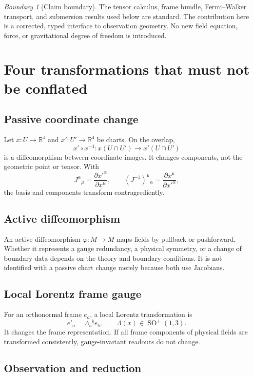 \documentclass[11pt,a4paper]{article}
\theoremstyle{definition}
\theoremstyle{plain}
\theoremstyle{remark}
\newtheorem{warning}[definition]{Boundary}
\newcommand{\R}{\mathbb{R}}
\newcommand{\SO}{\operatorname{SO}}
\begin{document}
\begin{warning}[Claim boundary]
The tensor calculus, frame bundle, Fermi--Walker transport, and submersion
results used below are standard. The contribution here is a corrected,
typed interface to observation geometry. No new field equation, force,
or gravitational degree of freedom is introduced.
\end{warning}

\section{Four transformations that must not be conflated}

\subsection{Passive coordinate change}

Let $x:U\to\R^4$ and $x':U'\to\R^4$ be charts. On the overlap,
\[
x'\circ x^{-1}:x(U\cap U')\to x'(U\cap U')
\]
is a diffeomorphism between coordinate images. It changes components, not
the geometric point or tensor. With
\[
J^\alpha{}_\mu=\frac{\partial x'^\alpha}{\partial x^\mu},
\qquad
(J^{-1})^\mu{}_\alpha
=\frac{\partial x^\mu}{\partial x'^\alpha},
\]
the basis and components transform contragrediently.

\subsection{Active diffeomorphism}

An active diffeomorphism $\varphi:M\to M$ maps fields by pullback or
pushforward. Whether it represents a gauge redundancy, a physical symmetry,
or a change of boundary data depends on the theory and boundary conditions.
It is not identified with a passive chart change merely because both use
Jacobians.

\subsection{Local Lorentz frame gauge}

For an orthonormal frame $e_a$, a local Lorentz transformation is
\[
e'_a=\Lambda_a{}^b e_b,
\qquad
\Lambda(x)\in\SO^+(1,3).
\]
It changes the frame representation. If all frame components of physical
fields are transformed consistently, gauge-invariant readouts do not change.

\subsection{Observation and reduction}
\end{document}
